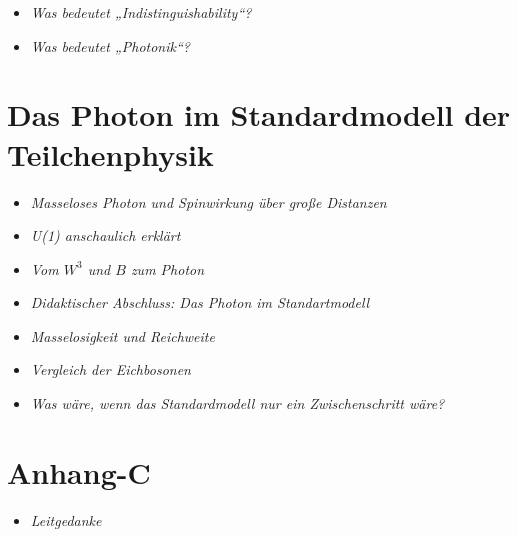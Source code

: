 \medskip
\begin{tcolorbox}[title=Hinweisboxen, hinweisbox]
	\begin{itemize}
		\item \emph{Was bedeutet „Indistinguishability“?} \dotfill\pageref{box:indistinguishability}
		\item \emph{Was bedeutet „Photonik“?} \dotfill\pageref{box:photonics_definition}
	\end{itemize}
\end{tcolorbox}
\section{Das Photon im Standardmodell der Teilchenphysik}
\medskip

\begin{tcolorbox}[title=physikalische Boxen, physikbox]
	\begin{itemize}
		\item \emph{Masseloses Photon und Spinwirkung über große Distanzen}\dotfill\pageref{box:photon_spin_reichweite}
	\end{itemize}
\end{tcolorbox}

\medskip
\begin{tcolorbox}[title=didaktische Boxen, didaktikbox]
	\begin{itemize}
		\item \emph{U(1) anschaulich erklärt} \dotfill\pageref{box:u1_kreis}
		\item \emph{Vom \(W^3\) und \(B\) zum Photon} \dotfill\pageref{box:weinberg_mischung}
		\item \emph{Didaktischer Abschluss: Das Photon  im Standartmodell} \dotfill\pageref{box:didaktik_kapVIII}
	\end{itemize}
\end{tcolorbox}

\medskip
\begin{tcolorbox}[title=Hinweisboxen, hinweisbox]
	\begin{itemize}
		\item \emph{Masselosigkeit und Reichweite} \dotfill\pageref{box:reichweite_masselos}
		\item \emph{Vergleich der Eichbosonen} \dotfill\pageref{box:eichbosonen_vergleich}
	\end{itemize}


\end{tcolorbox}
\begin{tcolorbox}[title=hypothetische Boxen, hypobox]
	\begin{itemize}
		
		\item \emph{Was wäre, wenn das Standardmodell nur ein Zwischenschritt wäre?} \dotfill\pageref{Merksatz zum Photon}
	\end{itemize}
\end{tcolorbox}
\section{Anhang-C}
\medskip
\begin{tcolorbox}[title=Leitgedanke, didaktikbox]
	\begin{itemize}
		\item \emph{Leitgedanke} \dotfill\pageref{box:leitgedanke}
		
	\end{itemize}
\end{tcolorbox}